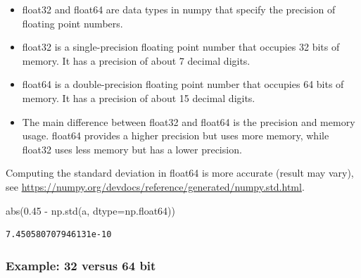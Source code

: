 \documentclass[
  letterpaper,
  DIV=11,
  numbers=noendperiod]{scrreprt}
\newenvironment{Shaded}{\begin{snugshade}}{\end{snugshade}}
\newcommand{\BuiltInTok}[1]{\textcolor[rgb]{0.00,0.23,0.31}{#1}}
\newcommand{\FloatTok}[1]{\textcolor[rgb]{0.68,0.00,0.00}{#1}}
\newcommand{\NormalTok}[1]{\textcolor[rgb]{0.00,0.23,0.31}{#1}}
\newcommand{\OperatorTok}[1]{\textcolor[rgb]{0.37,0.37,0.37}{#1}}
\providecommand{\tightlist}{%
  \setlength{\itemsep}{0pt}\setlength{\parskip}{0pt}}\usepackage{longtable,booktabs,array}
\begin{document}
\begin{tcolorbox}[enhanced jigsaw, left=2mm, toprule=.15mm, colframe=quarto-callout-note-color-frame, leftrule=.75mm, title=\textcolor{quarto-callout-note-color}{\faInfo}\hspace{0.5em}{Float data types}, toptitle=1mm, opacitybacktitle=0.6, arc=.35mm, titlerule=0mm, opacityback=0, bottomtitle=1mm, coltitle=black, rightrule=.15mm, colback=white, colbacktitle=quarto-callout-note-color!10!white, breakable, bottomrule=.15mm]

\begin{itemize}
\tightlist
\item
  float32 and float64 are data types in numpy that specify the precision
  of floating point numbers.
\item
  float32 is a single-precision floating point number that occupies 32
  bits of memory. It has a precision of about 7 decimal digits.
\item
  float64 is a double-precision floating point number that occupies 64
  bits of memory. It has a precision of about 15 decimal digits.
\item
  The main difference between float32 and float64 is the precision and
  memory usage. float64 provides a higher precision but uses more
  memory, while float32 uses less memory but has a lower precision.
\end{itemize}

\end{tcolorbox}

Computing the standard deviation in float64 is more accurate (result may
vary), see
\url{https://numpy.org/devdocs/reference/generated/numpy.std.html}.

\begin{Shaded}
\begin{Highlighting}[]
\BuiltInTok{abs}\NormalTok{(}\FloatTok{0.45} \OperatorTok{{-}}\NormalTok{ np.std(a, dtype}\OperatorTok{=}\NormalTok{np.float64))}
\end{Highlighting}
\end{Shaded}

\begin{verbatim}
7.450580707946131e-10
\end{verbatim}

\hypertarget{example-32-versus-64-bit}{%
\subsubsection{Example: 32 versus 64
bit}\label{example-32-versus-64-bit}}
\end{document}
